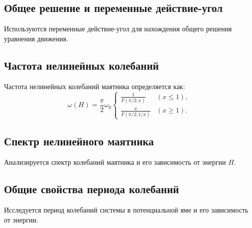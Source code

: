 \documentclass[10pt]{article}
\begin{document}
\subsection*{Общее решение и переменные действие-угол}
Используются переменные действие-угол для нахождения общего решения уравнения движения.

\subsection*{Частота нелинейных колебаний}
Частота нелинейных колебаний маятника определяется как:
\begin{equation*}
\omega(H)=\frac{\pi}{2} \omega_{0} \begin{cases}\frac{1}{F(\pi / 2 ; x)} & (x \leqslant 1), \\ \frac{x}{F(\pi / 2 ; 1 / x)} & (x \geqslant 1) .\end{cases} \tag{3.12}
\end{equation*}

\subsection*{Спектр нелинейного маятника}
Анализируется спектр колебаний маятника и его зависимость от энергии $H$.

\subsection*{Общие свойства периода колебаний}
Исследуется период колебаний системы в потенциальной яме и его зависимость от энергии.
\end{document}
